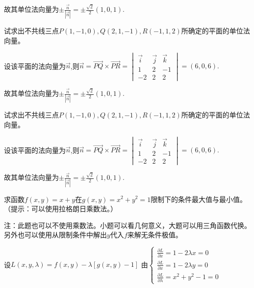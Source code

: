 \documentclass[twoside,12pt]{hnuexam}
\begin{document}
\begin{questions}
\begin{solution}
		故其单位法向量为$\pm\frac{\vec{n}}{|\vec{n}|}=\pm\frac{\sqrt{2}}{2}(1,0,1).$
	\end{solution}


\question
	试求出不共线三点$P(1,-1,0),Q(2,1,-1),R(-1,1,2)$所确定的平面的单位法向量。
	\begin{solution}
		设该平面的法向量为$\vec{n}$,则$\vec{n}=\vec{PQ}\times\vec{PR}=\begin{vmatrix}
				\vec{i} & \vec{j} & \vec{k} \\
				1       & 2       & -1      \\
				-2      & 2       & 2
			\end{vmatrix}=(6,0,6).$

		故其单位法向量为$\pm\frac{\vec{n}}{|\vec{n}|}=\pm\frac{\sqrt{2}}{2}(1,0,1).$
	\end{solution}
	\vspace*{\stretch{1}}

	\question
		试求出不共线三点$P(1,-1,0),Q(2,1,-1),R(-1,1,2)$所确定的平面的单位法向量。
		\begin{solution}
			设该平面的法向量为$\vec{n}$,则$\vec{n}=\vec{PQ}\times\vec{PR}=\begin{vmatrix}
					\vec{i} & \vec{j} & \vec{k} \\
					1       & 2       & -1      \\
					-2      & 2       & 2
				\end{vmatrix}=(6,0,6).$\score{2+5}
	
			故其单位法向量为$\pm\frac{\vec{n}}{|\vec{n}|}=\pm\frac{\sqrt{2}}{2}(1,0,1).$\score{10}
		\end{solution}
	\clearpage

	\question
	求函数$f(x,y)=x+y$在$g(x,y)=x^2+y^2=1$限制下的条件最大值与最小值。（提示：可以使用拉格朗日乘数法。）
	\begin{solution}
		注：此题也可以不使用乘数法。小题可以看几何意义，大题可以用三角函数代换。另外也可以使用从限制条件中解出$y$代入$f$来解无条件极值。

		设$L(x,y,\lambda)=f(x,y)-\lambda [g(x,y)-1]$
		由$\begin{cases}
				\frac{\partial L}{\partial x}=1-2\lambda x=0 \\
				\frac{\partial L}{\partial x}=1-2\lambda y=0 \\
				\frac{\partial L}{\partial \lambda}=x^2+y^2-1=0
			\end{cases}$\score{4}


\end{solution}
\end{questions}
\end{document}
